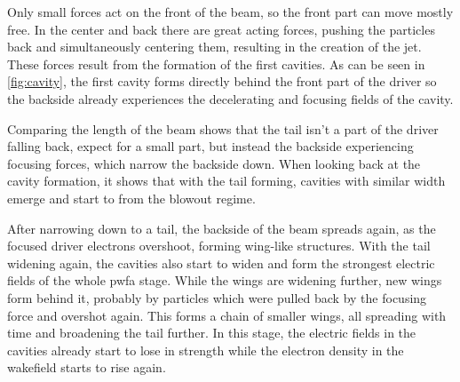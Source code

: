 \documentclass[bachelor_thesis]{subfiles}
\begin{document}
Only small forces act on the front of the beam, so the front part can move mostly free. In the center and back there are great acting forces, pushing the particles back and simultaneously centering them, resulting in the creation of the jet.
These forces result from the formation of the first cavities. As can be seen in \autoref{fig:cavity}, the first cavity forms directly behind the front part of the driver so the backside already experiences the decelerating and focusing fields of the cavity.
\begin{figure}
	\centering
	\missingfigure{}
	\caption{}
	\label{fig:cavity}
\end{figure}
Comparing the length of the beam shows that the tail isn't a part of the driver falling back, expect for a small part, but instead the backside experiencing focusing forces, which narrow the backside down.
When looking back at the cavity formation, it shows that with the tail forming, cavities with similar width emerge and start to from the blowout regime.

After narrowing down to a tail, the backside of the beam spreads again, as the focused driver electrons overshoot, forming wing-like structures. With the tail widening again, the cavities also start to widen and form the strongest electric fields of the whole \gls{pwfa} stage.
While the wings are widening further, new wings form behind it, probably by particles which were pulled back by the focusing force and overshot again. This forms a chain of smaller wings, all spreading with time and broadening the tail further.
In this stage, the electric fields in the cavities already start to lose in strength while the electron density in the wakefield starts to rise again.
\end{document}
